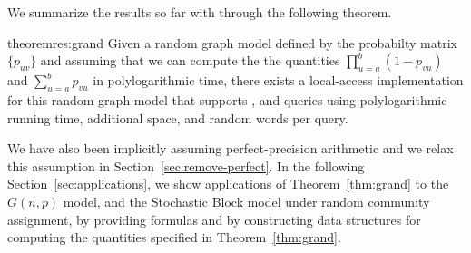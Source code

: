 We summarize the results so far with through the following theorem.

\begin{restatable}{theorem}{res:grand}
\label{thm:grand}
Given a random graph model defined by the probabilty matrix $\{ p_{uv}\}$ and assuming that we can compute the the quantities
$\prod_{u=a}^b (1-p_{vu})$ and $\sum_{u=a}^b p_{vu}$ in polylogarithmic time,
there exists a local-access implementation for this random graph model that supports ,
 and  queries using polylogarithmic running time, additional space, and random words per query.
\end{restatable}

We have also been implicitly assuming perfect-precision arithmetic and we relax this assumption in Section~\ref{sec:remove-perfect}.
In the following Section~\ref{sec:applications}, we show applications of Theorem~\ref{thm:grand} to the $G(n,p)$ model,
and the Stochastic Block model under random community assignment,
by providing formulas and by constructing data structures for computing the quantities specified in Theorem~\ref{thm:grand}.
